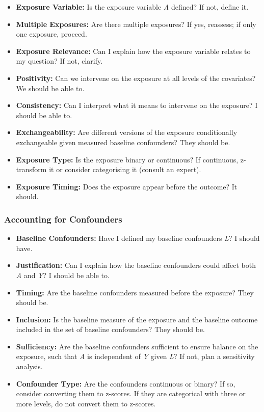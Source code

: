 \documentclass[
  singlecolumn]{article}
\providecommand{\tightlist}{%
  \setlength{\itemsep}{0pt}\setlength{\parskip}{0pt}}\usepackage{longtable,booktabs,array}
\begin{document}
\begin{itemize}
\tightlist
\item
  \textbf{Exposure Variable:} Is the exposure variable \emph{A} defined?
  If not, define it.
\item
  \textbf{Multiple Exposures:} Are there multiple exposures? If yes,
  reassess; if only one exposure, proceed.
\item
  \textbf{Exposure Relevance:} Can I explain how the exposure variable
  relates to my question? If not, clarify.
\item
  \textbf{Positivity:} Can we intervene on the exposure at all levels of
  the covariates? We should be able to.
\item
  \textbf{Consistency:} Can I interpret what it means to intervene on
  the exposure? I should be able to.
\item
  \textbf{Exchangeability:} Are different versions of the exposure
  conditionally exchangeable given measured baseline confounders? They
  should be.
\item
  \textbf{Exposure Type:} Is the exposure binary or continuous? If
  continuous, z-transform it or consider categorising it (consult an
  expert).
\item
  \textbf{Exposure Timing:} Does the exposure appear before the outcome?
  It should.
\end{itemize}

\subsubsection{Accounting for
Confounders}\label{accounting-for-confounders}

\begin{itemize}
\tightlist
\item
  \textbf{Baseline Confounders:} Have I defined my baseline confounders
  \emph{L}? I should have.
\item
  \textbf{Justification:} Can I explain how the baseline confounders
  could affect both \emph{A} and \emph{Y}? I should be able to.
\item
  \textbf{Timing:} Are the baseline confounders measured before the
  exposure? They should be.
\item
  \textbf{Inclusion:} Is the baseline measure of the exposure and the
  baseline outcome included in the set of baseline confounders? They
  should be.
\item
  \textbf{Sufficiency:} Are the baseline confounders sufficient to
  ensure balance on the exposure, such that \emph{A} is independent of
  \emph{Y} given \emph{L}? If not, plan a sensitivity analysis.
\item
  \textbf{Confounder Type:} Are the confounders continuous or binary? If
  so, consider converting them to z-scores. If they are categorical with
  three or more levels, do not convert them to z-scores.
\end{itemize}
\end{document}
